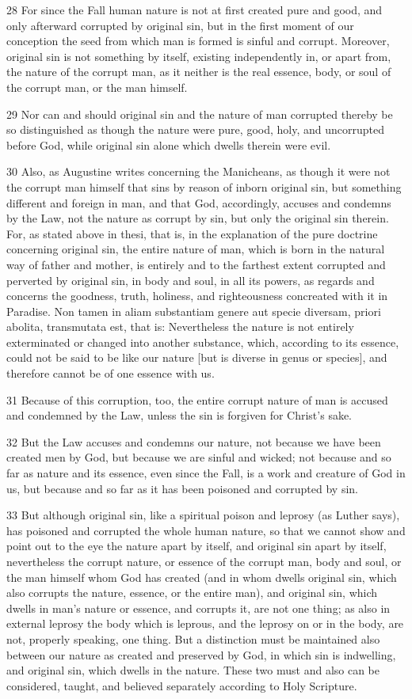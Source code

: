 28 For since the Fall human nature is not at first created pure and good, and only afterward corrupted by original sin, but in the first moment of our conception the seed from which man is formed is sinful and corrupt. Moreover, original sin is not something by itself, existing independently in, or apart from, the nature of the corrupt man, as it neither is the real essence, body, or soul of the corrupt man, or the man himself.

29 Nor can and should original sin and the nature of man corrupted thereby be so distinguished as though the nature were pure, good, holy, and uncorrupted before God, while original sin alone which dwells therein were evil.

30 Also, as Augustine writes concerning the Manicheans, as though it were not the corrupt man himself that sins by reason of inborn original sin, but something different and foreign in man, and that God, accordingly, accuses and condemns by the Law, not the nature as corrupt by sin, but only the original sin therein. For, as stated above in thesi, that is, in the explanation of the pure doctrine concerning original sin, the entire nature of man, which is born in the natural way of father and mother, is entirely and to the farthest extent corrupted and perverted by original sin, in body and soul, in all its powers, as regards and concerns the goodness, truth, holiness, and righteousness concreated with it in Paradise. Non tamen in aliam substantiam genere aut specie diversam, priori abolita, transmutata est, that is: Nevertheless the nature is not entirely exterminated or changed into another substance, which, according to its essence, could not be said to be like our nature [but is diverse in genus or species], and therefore cannot be of one essence with us.

31 Because of this corruption, too, the entire corrupt nature of man is accused and condemned by the Law, unless the sin is forgiven for Christ’s sake.

32 But the Law accuses and condemns our nature, not because we have been created men by God, but because we are sinful and wicked; not because and so far as nature and its essence, even since the Fall, is a work and creature of God in us, but because and so far as it has been poisoned and corrupted by sin.

33 But although original sin, like a spiritual poison and leprosy (as Luther says), has poisoned and corrupted the whole human nature, so that we cannot show and point out to the eye the nature apart by itself, and original sin apart by itself, nevertheless the corrupt nature, or essence of the corrupt man, body and soul, or the man himself whom God has created (and in whom dwells original sin, which also corrupts the nature, essence, or the entire man), and original sin, which dwells in man’s nature or essence, and corrupts it, are not one thing; as also in external leprosy the body which is leprous, and the leprosy on or in the body, are not, properly speaking, one thing. But a distinction must be maintained also between our nature as created and preserved by God, in which sin is indwelling, and original sin, which dwells in the nature. These two must and also can be considered, taught, and believed separately according to Holy Scripture.

